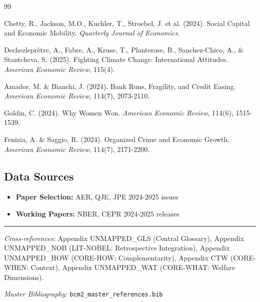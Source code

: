 \begin{thebibliography}{99}

 Chetty, R., Jackson, M.O., Kuchler, T., Stroebel, J. et al. (2024). Social Capital and Economic Mobility. \textit{Quarterly Journal of Economics}.

 Dechezleprêtre, A., Fabre, A., Kruse, T., Planterose, B., Sanchez-Chico, A., \& Stantcheva, S. (2025). Fighting Climate Change: International Attitudes. \textit{American Economic Review}, 115(4).

 Amador, M. \& Bianchi, J. (2024). Bank Runs, Fragility, and Credit Easing. \textit{American Economic Review}, 114(7), 2073-2110.

 Goldin, C. (2024). Why Women Won. \textit{American Economic Review}, 114(6), 1515-1539.

 Fenizia, A. \& Saggio, R. (2024). Organized Crime and Economic Growth. \textit{American Economic Review}, 114(7), 2171-2200.

\end{thebibliography}

\subsection{Data Sources}

\begin{itemize}[nosep]
    \item \textbf{Paper Selection:} AER, QJE, JPE 2024-2025 issues
    \item \textbf{Working Papers:} NBER, CEPR 2024-2025 releases
\end{itemize}



\vspace{1em}
\hrule
\vspace{0.5em}

\noindent\textit{Cross-references:}
Appendix UNMAPPED_GLS (Central Glossary),
Appendix UNMAPPED_NOB (LIT-NOBEL: Retrospective Integration),
Appendix UNMAPPED_HOW (CORE-HOW: Complementarity),
Appendix CTW (CORE-WHEN: Context),
Appendix UNMAPPED_WAT (CORE-WHAT: Welfare Dimensions).

\noindent\textit{Master Bibliography:} \texttt{bcm2\_master\_references.bib}


